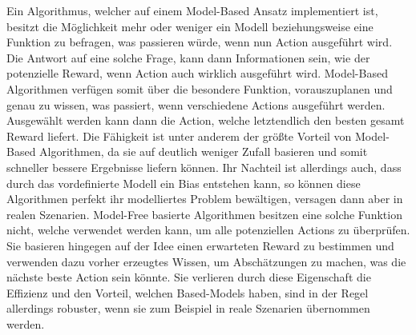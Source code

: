 \documentclass[]{iat}
\begin{document}
Ein Algorithmus, welcher auf einem Model-Based Ansatz implementiert ist, besitzt die Möglichkeit mehr oder weniger ein Modell beziehungsweise eine Funktion zu befragen, was passieren würde, wenn nun Action ausgeführt wird. Die Antwort auf eine solche Frage, kann dann Informationen sein, wie der potenzielle Reward, wenn Action auch wirklich ausgeführt wird. Model-Based Algorithmen verfügen somit über die besondere Funktion, vorauszuplanen und genau zu wissen, was passiert, wenn verschiedene Actions ausgeführt werden. Ausgewählt werden kann dann die Action, welche letztendlich den besten gesamt Reward liefert. Die Fähigkeit ist unter anderem der größte Vorteil von Model-Based Algorithmen, da sie auf deutlich weniger Zufall basieren und somit schneller bessere Ergebnisse liefern können. Ihr Nachteil ist allerdings auch, dass durch das vordefinierte Modell ein Bias entstehen kann, so können diese Algorithmen perfekt ihr modelliertes Problem bewältigen, versagen dann aber in realen Szenarien. Model-Free basierte Algorithmen besitzen eine solche Funktion nicht, welche verwendet werden kann, um alle potenziellen Actions zu überprüfen. Sie basieren hingegen auf der Idee einen erwarteten Reward zu bestimmen und verwenden dazu vorher erzeugtes Wissen, um Abschätzungen zu machen, was die nächste beste Action sein könnte. Sie verlieren durch diese Eigenschaft die Effizienz und den Vorteil, welchen Based-Models haben, sind in der Regel allerdings robuster, wenn sie zum Beispiel in reale Szenarien übernommen werden.
\end{document}
